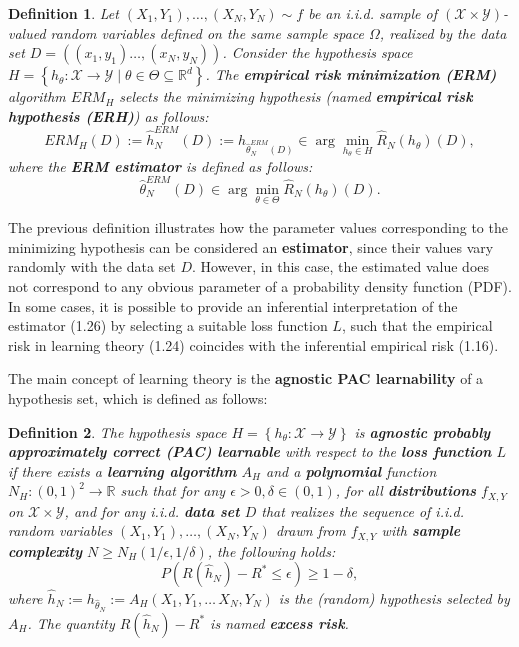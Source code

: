 \documentclass{report}
\newtheorem{definition}{Definition}[chapter]
\begin{document}
\begin{definition}
Let $(X_1, Y_1),\dots,(X_N, Y_N) \sim f$ be an i.i.d. sample of $(\mathcal{X} \times \mathcal{Y})$-valued random variables defined on the same sample space $\Omega$, realized by the data set $D =((x_1, y_1)\dots,(x_N,y_N))$. Consider the hypothesis space $H = \left\{h_\theta : \mathcal{X} \to \mathcal{Y} \mid\theta\in\Theta\subseteq\mathbb{R}^d\right\}$. The \textbf{empirical risk minimization (ERM)} algorithm $ERM_H$ selects the minimizing hypothesis (named \textbf{empirical risk hypothesis (ERH)}) as follows:
\begin{equation}
ERM_H(D) := \hat{h}_N^{ERM}(D) := h_{\hat{\theta}^{ERM}_N(D)} \in \arg \min_{h_\theta \in H} \hat{R}_N(h_\theta)(D),
\end{equation}
where the \textbf{ERM estimator} is defined as follows:
\begin{equation}
\hat{\theta}^{ERM}_N(D) \in \arg\min_{\theta \in \Theta}\hat{R}_N(h_\theta)(D).
\end{equation}
\end{definition}

The previous definition illustrates how the parameter values corresponding to the minimizing hypothesis can be considered an \textbf{estimator}, since their values vary randomly with the data set $D$. However, in this case, the estimated value does not correspond to any obvious parameter of a probability density function (PDF). In some cases, it is possible to provide an inferential interpretation of the estimator (1.26) by selecting a suitable loss function $L$, such that the empirical risk in learning theory (1.24) coincides with the inferential empirical risk (1.16).

The main concept of learning theory is the \textbf{agnostic PAC learnability} of a hypothesis set, which is defined as follows:

\begin{definition}
The hypothesis space $H = \left\{h_\theta : \mathcal{X} \to \mathcal{Y}\right\}$ is \textbf{agnostic probably approximately correct (PAC) learnable} with respect to the \textbf{loss function} $L$ if there exists a \textbf{learning algorithm} $A_H$ and a \textbf{polynomial} function $N_H : (0,1) ^2 \to \mathbb{R}$ such that for any $\epsilon > 0,\delta \in (0,1)$, for all \textbf{distributions} $f_{X,Y}$ on $\mathcal{X} \times \mathcal{Y}$, and for any i.i.d. \textbf{data set} $D$ that realizes the sequence of i.i.d. random variables $(X_1, Y_1),\dots,(X_N, Y_N)$ drawn from $f_{X,Y}$ with \textbf{sample complexity} $N\geq N_H(1/\epsilon,1/\delta)$, the following holds:
\begin{equation}
P\left(R(\hat{h}_N) - R^* \leq \epsilon\right) \geq 1- \delta,
\end{equation}
where $\hat{h}_N := h_{\hat{\theta}_N} := A_H(X_1, Y_1,\dots\,X_N, Y_N)$ is the (random) hypothesis selected by $A_H$. The quantity $R(\hat{h}_N) - R^*$ is named \textbf{excess risk}.
\end{definition}
\end{document}
